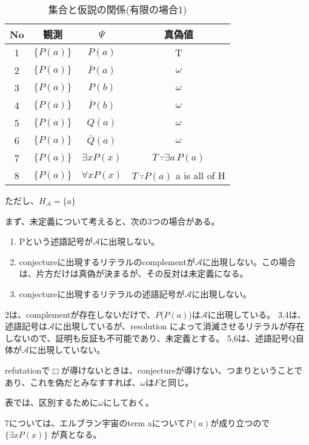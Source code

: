 \documentclass[10pt, oneside]{jarticle}   	%
\theoremstyle{definition}
\newcommand{\undet}{\omega}
\newcommand{\cont}{\Box}
\newcommand{\eset}[1]{\{{#1}\}}
\begin{document}
\begin{table}[htbp]
 \centering
 \begin{tabular}{|c|c|c|c|}\hline
   No & 観測 & $\Psi$ & 真偽値 \\ \hline
   1 & $\eset{P(a)}$ & $P(a)$ & T \\ \hline
   2 & $\eset{P(a)}$ & $\bar P(a)$ &$\undet$  \\ \hline
   3 & $\eset{P(a)}$ & $P(b)$ & $\undet$ \\ \hline
   4 & $\eset{P(a)}$ & $\bar P(b)$ & $\undet$ \\ \hline
   5 & $\eset{P(a)}$ & $Q(a)$ & $\undet$ \\ \hline
   6 & $\eset{P(a)}$ & $\bar Q(a)$ & $\undet$ \\ \hline
   7 & $\eset{P(a)}$ & $\exists x P(x)$ & $T \, \because \exists a \, P(a)$ \\ \hline
   8 & $\eset{P(a)}$ & $\forall x P(x)$ & $T  \, \because P(a) $ a  is all of  H \\ \hline
 \end{tabular}
 \caption{集合と仮説の関係(有限の場合1)}
 \label{tab:ex1}
\end{table}

ただし、$H_{\mathcal{A}} = \eset{a}$


まず、未定義について考えると、次の3つの場合がある。
\begin{enumerate}
\item Pという述語記号が$\mathcal{A}$に出現しない。
\item conjectureに出現するリテラルのcomplementが$\mathcal{A}$に出現しない。この場合は、片方だけは真偽が決まるが、その反対は未定義になる。
\item conjectureに出現するリテラルの述語記号が$\mathcal{A}$に出現しない。
\end{enumerate}

2は、complementが存在しないだけで、$P$($P(a)$)は$\mathcal{A}$に出現している。
3,4は、述語記号は$\mathcal{A}$に出現しているが、resolution によって消滅させるリテラルが存在しないので、証明も反証も不可能であり、未定義とする。
5,6は、述語記号Q自体が$\mathcal{A}$に出現していない。

refutationで$\cont$が導けないときは、conjectureが導けない、つまりということであり、これを偽だとみなすすれば、$\undet$は$F$と同じ。

表では、区別するために$\undet$にしておく。

7については、エルブラン宇宙のterm aについて$P(a)$が成り立つので$\{\exists x P(x)\}$ が真となる。
\end{document}
